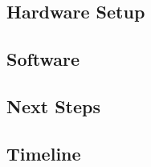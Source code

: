 \documentclass[pageno]{jpaper}
\begin{document}
\subsection{Hardware Setup}

\subsection{Software}

\subsection{Next Steps}

\subsection{Timeline}


\newpage


\nocite{*}
\end{document}

